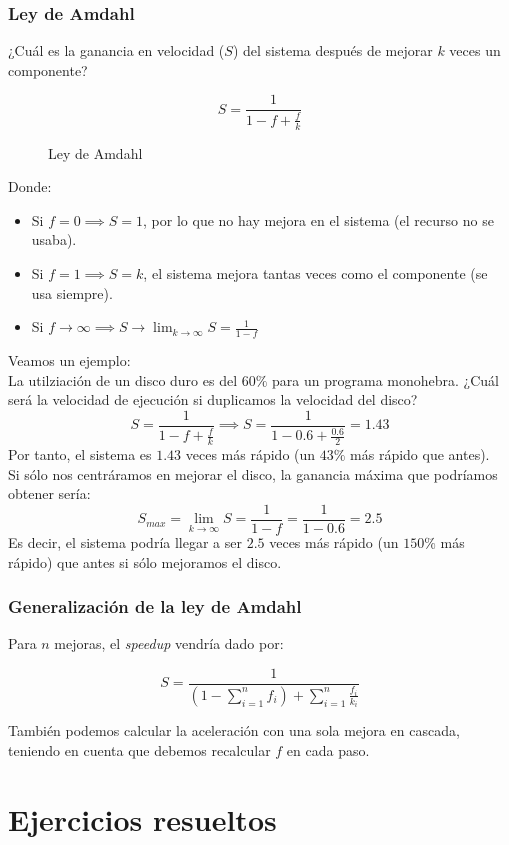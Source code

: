 \documentclass[12pt,spanish]{article}
\begin{document}
\subsubsection{Ley de Amdahl}
¿Cuál es la ganancia en velocidad ($S$) del sistema después de mejorar $k$ veces un componente?
\begin{figure}[H]
	\begin{equation}
		S=\frac{1}{1-f+\frac{f}{k}}
	\end{equation}
	\caption{Ley de Amdahl}
\end{figure}
Donde:
\begin{itemize}
	\item Si $f=0 \implies S=1$, por lo que no hay mejora en el sistema (el recurso no se usaba).
	\item Si $f=1 \implies S=k$, el sistema mejora tantas veces como el componente (se usa siempre).
	\item Si $f\to \infty \implies S \to \lim_{k \to \infty} S=\frac{1}{1-f}$
\end{itemize}

Veamos un ejemplo:\\
La utilziación de un disco duro es del $60\%$ para un programa monohebra. ¿Cuál será la velocidad de ejecución si duplicamos la velocidad del disco?
\[
S=\frac{1}{1-f+\frac{f}{k}} \implies S=\frac{1}{1-0.6+\frac{0.6}{2}}=1.43
\]
Por tanto, el sistema es $1.43$ veces más rápido (un $43\%$ más rápido que antes).\\
Si sólo nos centráramos en mejorar el disco, la ganancia máxima que podríamos obtener sería:
\[
S_{max}=\lim_{k \to \infty}S=\frac{1}{1-f}=\frac{1}{1-0.6}=2.5
\]
Es decir, el sistema podría llegar a ser $2.5$ veces más rápido (un $150\%$ más rápido) que antes si sólo mejoramos el disco.

\subsubsection{Generalización de la ley de Amdahl}

Para $n$ mejoras, el \textit{speedup} vendría dado por:

\[
S=\frac{1}{(1-\sum_{i=1}^{n}f_i) + \sum_{i=1}^{n}\frac{f_i}{k_i}}
\]

También podemos calcular la aceleración con una sola mejora en cascada, teniendo en cuenta que debemos recalcular $f$ en cada paso.


\section{Ejercicios resueltos}
\end{document}
